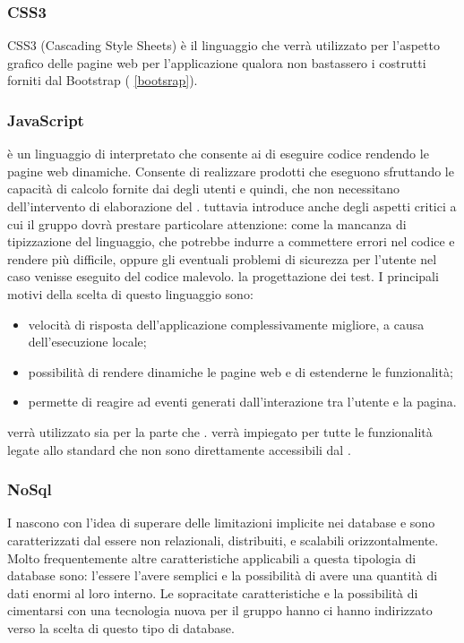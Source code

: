 \documentclass[12pt,a4paper]{article}
\begin{document}
\subsubsection{CSS3}\label{css}
CSS3 (Cascading Style Sheets) è il linguaggio che verrà utilizzato per l’aspetto grafico delle pagine web per l'applicazione qualora non bastassero i costrutti forniti dal  Bootstrap ( \ref{bootsrap}).

\subsubsection{JavaScript}\label{javascript}
 è un linguaggio di  interpretato che consente ai  di eseguire codice rendendo le pagine web dinamiche. Consente di realizzare prodotti  che eseguono sfruttando le capacità di calcolo fornite dai  degli utenti e quindi, che non necessitano dell’intervento di elaborazione del .  tuttavia introduce anche degli aspetti critici a cui il gruppo dovrà prestare particolare attenzione: come la mancanza di tipizzazione del linguaggio, che potrebbe indurre a commettere errori nel codice e rendere più difficile, oppure gli eventuali problemi di sicurezza per l'utente nel caso venisse eseguito del codice malevolo. la progettazione dei test. I principali motivi della scelta di questo linguaggio sono:

\begin{itemize}
	\item velocità di risposta dell’applicazione complessivamente migliore, a causa dell’esecuzione locale;
	\item possibilità di rendere dinamiche le pagine web e di estenderne le funzionalità;
	\item permette di reagire ad eventi generati dall’interazione tra l’utente e la pagina.
\end{itemize}

 verrà utilizzato sia per la parte  che .  verrà impiegato per tutte le funzionalità legate allo standard  che non sono direttamente accessibili dal  .

\subsubsection{NoSql}\label{nosql}
I   nascono con l'idea di superare delle limitazioni implicite nei database  e sono caratterizzati dal essere non relazionali, distribuiti,  e scalabili orizzontalmente. Molto frequentemente altre caratteristiche applicabili a questa tipologia di database sono: l'essere  l'avere  semplici e la possibilità di avere una quantità di dati enormi al loro interno. Le sopracitate caratteristiche e la possibilità di cimentarsi con una tecnologia nuova per il gruppo hanno ci hanno indirizzato verso la scelta di questo tipo di database.
\end{document}
